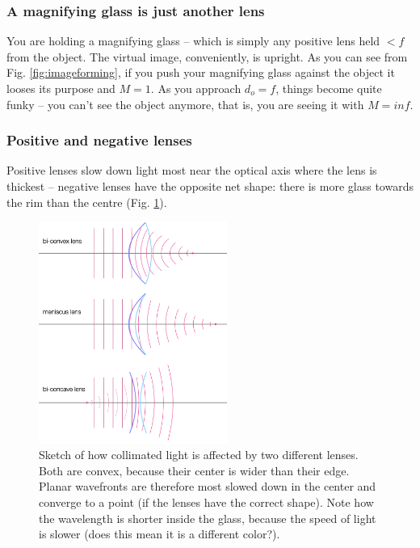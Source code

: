 \documentclass[a4paper]{report}
\begin{document}
	
	\subsubsection{A magnifying glass is just another lens}
	You are holding a magnifying glass -- which is simply any positive lens held $<f$ from the object. The virtual image, conveniently, is upright. As you can see from Fig. \ref{fig:imageforming}, if you push your magnifying glass against the object it looses its purpose and $M=1$. As you approach $d_o=f$, things become quite funky -- you can't see the object anymore, that is, you are seeing it with $M=inf$.


	
	\subsubsection{Positive and negative lenses}
	Positive lenses slow down light most near the optical axis where the lens is thickest -- negative lenses have the opposite net shape: there is more glass towards the rim than the centre (Fig. \ref{fig:lens_wave}). 
	
	\begin{figure}[h]
		\center
		\includegraphics[width=0.55\textwidth]{figures/lens_wave_picture.png}
		\captionsetup{width=0.6\textwidth}
		\caption{Sketch of how collimated light is affected by two different lenses. Both are convex, because their center is wider than their edge. Planar wavefronts are therefore most slowed down in the center and converge to a point (if the lenses have the correct shape). Note how the wavelength is shorter inside the glass, because the speed of light is slower (does this mean it is a different color?).}
		\label{fig:lens_wave}
	\end{figure}
\end{document}
